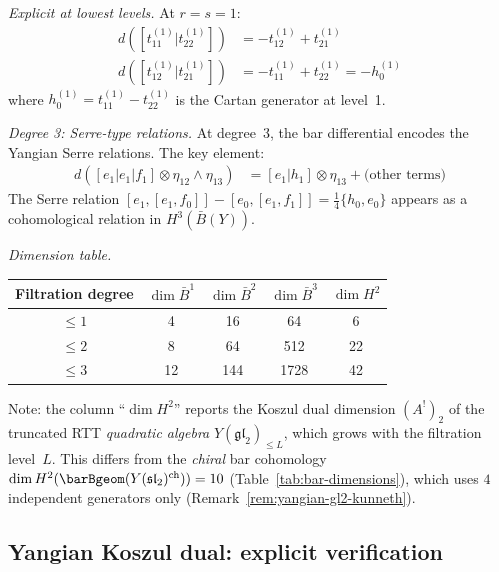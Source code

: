 \begin{computation}
\emph{Explicit at lowest levels.}
At $r = s = 1$:
\begin{align*}
d([t_{11}^{(1)} | t_{22}^{(1)}])
&= -t_{12}^{(1)} + t_{21}^{(1)} \\
d([t_{12}^{(1)} | t_{21}^{(1)}])
&= -t_{11}^{(1)} + t_{22}^{(1)} = -h_0^{(1)}
\end{align*}
where $h_0^{(1)} = t_{11}^{(1)} - t_{22}^{(1)}$ is the Cartan
generator at level~1.

\emph{Degree 3: Serre-type relations.}
At degree~3, the bar differential encodes the Yangian Serre
relations.  The key element:
\begin{align*}
d([e_1 | e_1 | f_1] \otimes \eta_{12} \wedge \eta_{13})
&= [e_1 | h_1] \otimes \eta_{13}
+ \text{(other terms)}
\end{align*}
The Serre relation
$[e_1, [e_1, f_0]] - [e_0, [e_1, f_1]] = \frac{1}{4}\{h_0, e_0\}$
appears as a cohomological relation in $H^3(\bar{B}(Y))$.

\emph{Dimension table.}
\begin{center}
\renewcommand{\arraystretch}{1.2}
\begin{tabular}{c|cccc}
Filtration degree & $\dim \bar{B}^1$ & $\dim \bar{B}^2$ &
$\dim \bar{B}^3$ & $\dim H^2$ \\
\hline
$\leq 1$ & 4 & 16 & 64 & 6 \\
$\leq 2$ & 8 & 64 & 512 & 22 \\
$\leq 3$ & 12 & 144 & 1728 & 42
\end{tabular}
\end{center}
Note: the column ``$\dim H^2$'' reports the Koszul dual dimension
$(A^!)_2$ of the truncated RTT \emph{quadratic algebra}
$Y(\mathfrak{gl}_2)_{\leq L}$, which grows with the filtration
level~$L$.  This differs from the \emph{chiral} bar cohomology
$\dim H^2(\barBgeom(Y(\mathfrak{sl}_2)^{\mathrm{ch}})) = 10$
(Table~\ref{tab:bar-dimensions}), which uses
$4$ independent generators only (Remark~\ref{rem:yangian-gl2-kunneth}).
\end{computation}


\subsection{Yangian Koszul dual: explicit verification}

